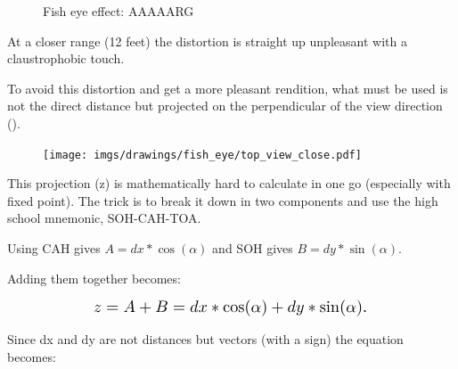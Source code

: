 \begin{minipage}{\textwidth}
 \begin{figure}[H]
\centering
 \caption{Fish eye effect: AAAAARG} \label{fig:mips}
 \end{figure}
 

\begin{minipage}{.4\textwidth}
At a closer range (12 feet) the distortion is straight up unpleasant with a claustrophobic touch.\\
\par
To avoid this distortion and get a more pleasant rendition, what must be used is not the direct distance  but  projected on the perpendicular of the view direction ().
 \end{minipage}
\begin{minipage}{.6\textwidth}
 \begin{figure}[H]
  \begin{flushright}
  \texttt{[image: imgs/drawings/fish\_eye/top\_view\_close.pdf]}
 \end{flushright}
\end{figure}
 \end{minipage}
\end{minipage}
\par



\begin{figure}[H]

 
\label{fig:Raycasting2}
 
\end{figure}

This projection (z) is mathematically hard to calculate in one go (especially with fixed point). The trick is to break it down in two components and use the high school mnemonic, SOH-CAH-TOA.\\


\begin{figure}[H]
\centering
 
 
\end{figure}
Using CAH gives $A = dx * \cos(\alpha)$ and SOH gives $B = dy * \sin(\alpha) $.\\
\par

Adding them together becomes:
\par
\begin{figure}[H]
  \centering
  \begin{equation*}
    \scalebox{1.3}{
$z = A + B = dx * \cos(\alpha) + dy * \sin(\alpha) $. 
 }
  \end{equation*}
\end{figure}
Since dx and dy are not distances but vectors (with a sign) the equation becomes: 


